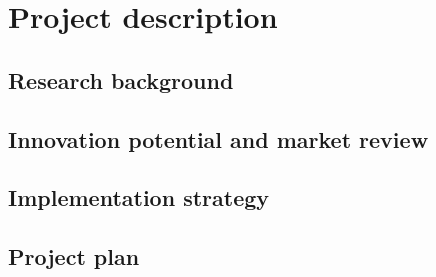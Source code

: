 \newpage
\section{Project description}

\subsection{Research background}

\subsection{Innovation potential and market review} 

\subsection{Implementation strategy}

\subsection{Project plan}

